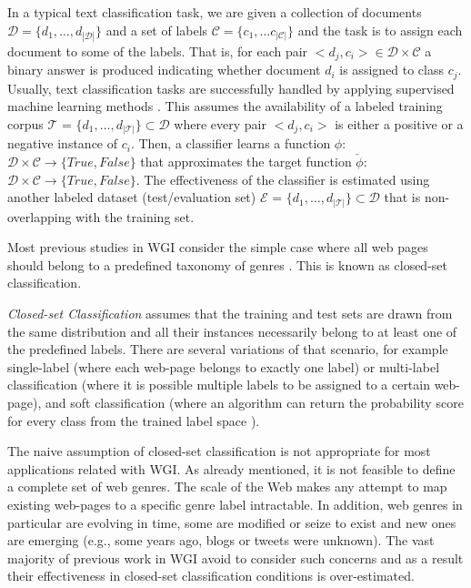 In a typical text classification task, we are given a collection of documents $\mathcal{D}=\{d_1,\dots,d_{|\mathcal{D}|}\}$ and a set of labels $\mathcal{C}= \{c_1, \dots c_{|\mathcal{C}|} \}$ and the task is to assign each document to some of the labels. That is, for each pair $<d_j,c_i>\in \mathcal{D}\times \mathcal{C}$ a binary answer is produced indicating whether document $d_i$ is assigned to class $c_j$. Usually, text classification tasks are successfully handled by applying supervised machine learning methods \parencite{sebastiani2002}. This assumes the availability of a labeled training corpus $\mathcal{T}$ = $\{d_1,\dots, d_{|\mathcal{T}|}\} \subset \mathcal{D}$ where every pair $<d_j,c_i>$ is either a positive or a negative instance of $c_i$. Then, a classifier learns a function $\phi$:$\mathcal{D}\times\mathcal{C}\rightarrow \{True, False\}$ that approximates the target function $\check{\phi}$:$\mathcal{D}\times\mathcal{C}\rightarrow \{True, False\}$. The effectiveness of the classifier is estimated using another labeled dataset (test/evaluation set) $\mathcal{E}$ = $\{d_1,\dots, d_{|\mathcal{T}|}\} \subset \mathcal{D}$ that is non-overlapping with the training set.

Most previous studies in WGI consider the simple case where all web pages should belong to a predefined taxonomy of genres \parencite{Lim2005,santini2007automatic,kanaris2009learning,jebari2014pureURL}. This is known as closed-set classification.

\begin{definition}{\textit{Closed-set Classification}}
assumes that the training and test sets are drawn from the same distribution and all their instances necessarily belong to at least one of the predefined labels. There are several variations of that scenario, for example single-label (where each web-page belongs to exactly one label) or multi-label classification (where it is possible multiple labels to be assigned to a certain web-page), and soft classification (where an algorithm can return the probability score for every class from the trained label space \parencite{geng2018recent}).
\end{definition}

The naive assumption of closed-set classification is not appropriate for most applications related with WGI. As already mentioned, it is not feasible to define a complete set of web genres. The scale of the Web makes any attempt to map existing web-pages to a specific genre label intractable. In addition, web genres in particular are evolving in time, some are modified or seize to exist and new ones are emerging (e.g., some years ago, blogs or tweets were unknown). The vast majority of previous work in WGI avoid to consider such concerns and as a result their effectiveness in closed-set classification conditions is over-estimated.

